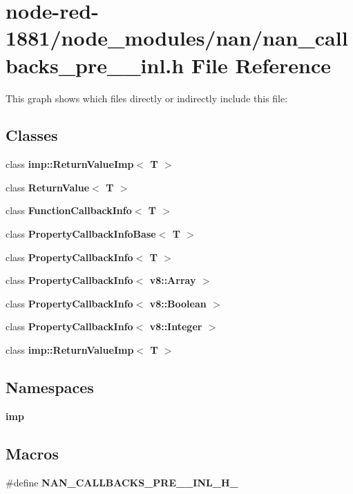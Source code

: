 \section{node-\/red-\/1881/node\+\_\+modules/nan/nan\+\_\+callbacks\+\_\+pre\+\_\+\_\+inl.h File Reference}
\label{nan__callbacks__pre__12__inl_8h}
This graph shows which files directly or indirectly include this file\+:
\subsection*{Classes}
\begin{DoxyCompactItemize}
\item 
class \textbf{ imp\+::\+Return\+Value\+Imp$<$ T $>$}
\item 
class \textbf{ Return\+Value$<$ T $>$}
\item 
class \textbf{ Function\+Callback\+Info$<$ T $>$}
\item 
class \textbf{ Property\+Callback\+Info\+Base$<$ T $>$}
\item 
class \textbf{ Property\+Callback\+Info$<$ T $>$}
\item 
class \textbf{ Property\+Callback\+Info$<$ v8\+::\+Array $>$}
\item 
class \textbf{ Property\+Callback\+Info$<$ v8\+::\+Boolean $>$}
\item 
class \textbf{ Property\+Callback\+Info$<$ v8\+::\+Integer $>$}
\item 
class \textbf{ imp\+::\+Return\+Value\+Imp$<$ T $>$}
\end{DoxyCompactItemize}
\subsection*{Namespaces}
\begin{DoxyCompactItemize}
\item 
 \textbf{ imp}
\end{DoxyCompactItemize}
\subsection*{Macros}
\begin{DoxyCompactItemize}
\item 
\#define \textbf{ N\+A\+N\+\_\+\+C\+A\+L\+L\+B\+A\+C\+K\+S\+\_\+\+P\+R\+E\+\_\+\_\+\+I\+N\+L\+\_\+\+H\+\_\+}
\end{DoxyCompactItemize}
